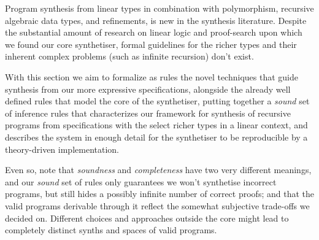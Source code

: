 \documentclass{llncs}
\begin{document}

Program synthesis from linear types in combination with polymorphism, recursive
algebraic data types, and refinements, is new in the synthesis 
literature. Despite the substantial amount of research on linear logic and
proof-search upon which we found our core synthetiser, formal guidelines for the
richer types and their inherent complex problems (such as infinite recursion)
don't exist. %

With this section we aim to formalize as rules the novel techniques that guide
synthesis from our more expressive specifications, alongside the already well
defined rules that model the core of the synthetiser, putting together a
\emph{sound} set of inference rules that characterizes our framework for synthesis of
recursive programs from specifications with the select richer types in a linear context,
and describes the system in enough detail for the synthetiser to be reproducible
by a theory-driven implementation.

Even so, note that \emph{soundness} and \emph{completeness} have two very
different meanings, and our \emph{sound} set of rules only guarantees we won't
synthetise incorrect programs, but still hides a possibly infinite number of correct
proofs; and that the valid programs derivable through it reflect the somewhat
subjective trade-offs we decided on. Different choices and approaches outside
the core might lead to completely distinct synths and spaces of valid programs.
\end{document}
